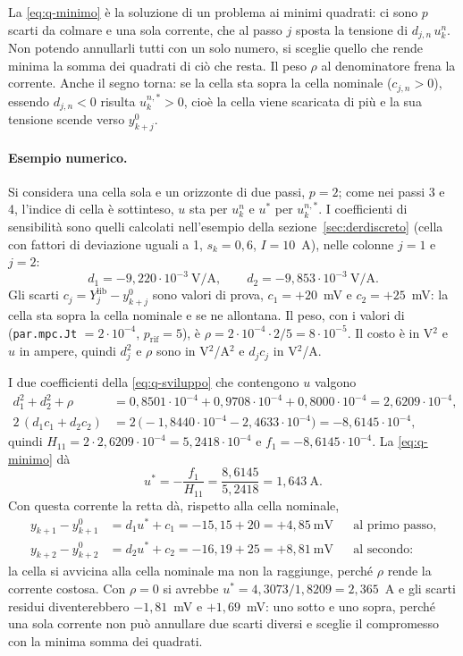 \documentclass[11pt,a4paper]{article}
\newcommand{\file}[1]{\texttt{\detokenize{#1}}}
\newcommand{\lib}{\mathrm{lib}}
\begin{document}
La \eqref{eq:q-minimo} è la soluzione di un problema ai minimi quadrati: ci
sono $p$ scarti da colmare e una sola corrente, che al passo $j$ sposta la
tensione di $d_{j,n}\,u^n_k$. Non potendo annullarli tutti con un solo numero,
si sceglie quello che rende minima la somma dei quadrati di ciò che resta. Il
peso $\rho$ al denominatore frena la corrente. Anche il segno torna: se la
cella sta sopra la cella nominale ($c_{j,n} > 0$), essendo $d_{j,n} < 0$
risulta $u^{n,*}_k > 0$, cioè la cella viene scaricata di più e la sua tensione
scende verso $y^0_{k+j}$.

\paragraph{Esempio numerico.} Si considera una cella sola e un orizzonte di
due passi, $p = 2$; come nei passi 3 e 4, l'indice di cella è sottinteso, $u$
sta per $u^n_k$ e $u^*$ per $u^{n,*}_k$.
I coefficienti di sensibilità sono quelli calcolati
nell'esempio della sezione~\ref{sec:derdiscreto} (cella con fattori di
deviazione uguali a 1, $s_k = 0{,}6$, $I = 10$~A), nelle colonne $j = 1$ e
$j = 2$:
\[
  d_1 = -9{,}220 \cdot 10^{-3}~\text{V/A}, \qquad
  d_2 = -9{,}853 \cdot 10^{-3}~\text{V/A}.
\]
Gli scarti $c_j = Y^\lib_j - y^0_{k+j}$ sono valori di prova,
$c_1 = +20$~mV e $c_2 = +25$~mV: la cella sta sopra la cella nominale e se ne
allontana. Il peso, con i valori di
\file{init_parametri.m} (\texttt{par.mpc.Jt} $= 2 \cdot 10^{-4}$,
$p_{\mathrm{rif}} = 5$), è $\rho = 2 \cdot 10^{-4} \cdot 2/5 = 8 \cdot
10^{-5}$. Il costo è in V$^2$ e $u$ in ampere, quindi $d_j^2$ e $\rho$ sono in
V$^2$/A$^2$ e $d_j c_j$ in V$^2$/A.

I due coefficienti della \eqref{eq:q-sviluppo} che contengono $u$ valgono
\begin{align*}
  d_1^2 + d_2^2 + \rho
    &= 0{,}8501 \cdot 10^{-4} + 0{,}9708 \cdot 10^{-4} + 0{,}8000 \cdot 10^{-4}
     = 2{,}6209 \cdot 10^{-4} , \\
  2\,(d_1 c_1 + d_2 c_2)
    &= 2\,\bigl(-1{,}8440 \cdot 10^{-4} - 2{,}4633 \cdot 10^{-4}\bigr)
     = -8{,}6145 \cdot 10^{-4} ,
\end{align*}
quindi $H_{11} = 2 \cdot 2{,}6209 \cdot 10^{-4} = 5{,}2418 \cdot 10^{-4}$ e
$f_1 = -8{,}6145 \cdot 10^{-4}$. La \eqref{eq:q-minimo} dà
\[
  u^* = -\frac{f_1}{H_{11}} = \frac{8{,}6145}{5{,}2418} = 1{,}643~\text{A}.
\]
Con questa corrente la retta dà, rispetto alla cella nominale,
\begin{align*}
  y_{k+1} - y^0_{k+1} &= d_1 u^* + c_1 = -15{,}15 + 20 = +4{,}85~\text{mV}
    && \text{al primo passo}, \\
  y_{k+2} - y^0_{k+2} &= d_2 u^* + c_2 = -16{,}19 + 25 = +8{,}81~\text{mV}
    && \text{al secondo}:
\end{align*}
la cella si avvicina alla cella nominale ma non la raggiunge, perché $\rho$
rende la corrente costosa.
Con $\rho = 0$ si avrebbe $u^* = 4{,}3073/1{,}8209 = 2{,}365$~A e gli scarti
residui diventerebbero $-1{,}81$~mV e $+1{,}69$~mV: uno sotto e uno sopra,
perché una sola corrente non può annullare due scarti diversi e sceglie il
compromesso con la minima somma dei quadrati.
\end{document}

